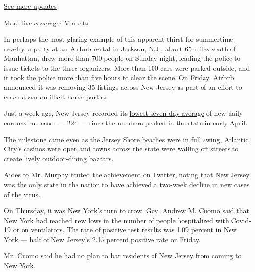 \href{https://www.nytimes.com/2020/08/01/world/coronavirus-covid-19.html?action=click\&pgtype=Article\&state=default\&region=MAIN_CONTENT_1\&context=storylines_live_updates}{See
more updates}

More live coverage:
\href{https://www.nytimes.com/live/2020/07/31/business/stock-market-today-coronavirus?action=click\&pgtype=Article\&state=default\&region=MAIN_CONTENT_1\&context=storylines_live_updates}{Markets}

In perhaps the most glaring example of this apparent thirst for
summertime revelry, a party at an Airbnb rental in Jackson, N.J., about
65 miles south of Manhattan, drew more than 700 people on Sunday night,
leading the police to issue tickets to the three organizers. More than
100 cars were parked outside, and it took the police more than five
hours to clear the scene. On Friday, Airbnb announced it was removing 35
listings across New Jersey as part of an effort to crack down on illicit
house parties.

Just a week ago, New Jersey recorded its
\href{https://www.nytimes.com/interactive/2020/us/new-jersey-coronavirus-cases.html}{lowest
seven-day average} of new daily coronavirus cases --- 224 --- since the
numbers peaked in the state in early April.

The milestone came even as the
\href{https://www.nytimes.com/2020/05/21/nyregion/jersey-shore-reopen-coronavirus.html}{Jersey
Shore beaches} were in full swing,
\href{https://www.nytimes.com/2020/07/03/nyregion/atlantic-city-casinos-reopening-coronavirus.html}{Atlantic
City's casinos} were open and towns across the state were walling off
streets to create lively outdoor-dining bazaars.

Aides to Mr. Murphy touted the achievement on
\href{https://twitter.com/GunaRockYa/status/1286285839744618496}{Twitter,}
noting that New Jersey was the only state in the nation to have achieved
a
\href{https://www.nj.com/coronavirus/2020/07/only-one-state-in-the-us-has-seen-covid-19-cases-drop-for-two-weeks-running.html}{two-week
decline} in new cases of the virus.

On Thursday, it was New York's turn to crow. Gov. Andrew M. Cuomo said
that New York had reached new lows in the number of people hospitalized
with Covid-19 or on ventilators. The rate of positive test results was
1.09 percent in New York --- half of New Jersey's 2.15 percent positive
rate on Friday.

Mr. Cuomo said he had no plan to bar residents of New Jersey from coming
to New York.

